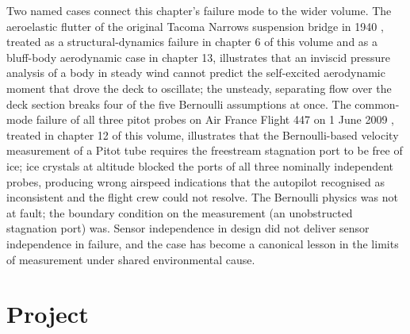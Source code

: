 Two named cases connect this chapter's failure mode to the wider
volume. The aeroelastic flutter of the original Tacoma Narrows
suspension bridge in 1940
\cite{acc:tacoma-narrows-1941}, treated as a structural-dynamics
failure in chapter 6 of this volume and as a bluff-body
aerodynamic case in chapter 13, illustrates that an inviscid
pressure analysis of a body in steady wind cannot predict the
self-excited aerodynamic moment that drove the deck to oscillate;
the unsteady, separating flow over the deck section breaks four of
the five Bernoulli assumptions at once. The common-mode failure of
all three pitot probes on Air France Flight 447 on 1 June 2009
\cite{acc:bea-af447}, treated in chapter 12 of this volume,
illustrates that the Bernoulli-based velocity measurement of a
Pitot tube requires the freestream stagnation port to be free of
ice; ice crystals at altitude blocked the ports of all three
nominally independent probes, producing wrong airspeed indications
that the autopilot recognised as inconsistent and the flight crew
could not resolve. The Bernoulli physics was not at fault; the
boundary condition on the measurement (an unobstructed stagnation
port) was. Sensor independence in design did not deliver sensor
independence in failure, and the case has become a canonical
lesson in the limits of measurement under shared environmental
cause.

\section{Project}

